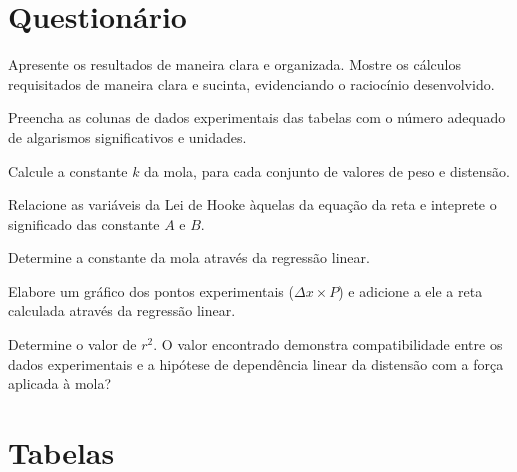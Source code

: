 \section{Questionário}

\begin{question}[type={exam}]{1}
Apresente os resultados de maneira clara e organizada. Mostre os cálculos requisitados de maneira clara e sucinta, evidenciando o raciocínio desenvolvido.
\end{question}

\begin{question}[type={exam}]{2}
Preencha as colunas de dados experimentais das tabelas com o número adequado de algarismos significativos e unidades.
\end{question}

\begin{question}[type={exam}]{1} 
Calcule a constante $k$ da mola, para cada conjunto de valores de peso e distensão.
\end{question}

\begin{question}[type={exam}]{1} 
Relacione as variáveis da Lei de Hooke àquelas da equação da reta e inteprete o significado das constante $A$ e $B$.
\end{question}

\begin{question}[type={exam}]{2} 
Determine a constante da mola através da regressão linear.
\end{question}

\begin{question}[type={exam}]{2} 
Elabore um gráfico dos pontos experimentais ($\Delta x \times P$) e adicione a ele a reta calculada através da regressão linear.
\end{question}

\begin{question}[type={exam}]{1} 
Determine o valor de $r^2$. O valor encontrado demonstra compatibilidade entre os dados experimentais e a hipótese de dependência linear da distensão com a força aplicada à mola?
\end{question}
\vfill

\pagebreak
\section{Tabelas}

